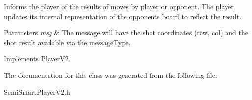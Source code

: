 Informs the player of the results of move\textquotesingle{}s by player or opponent. The player updates its internal representation of the opponent\textquotesingle{}s board to reflect the result. 


\begin{DoxyParams}{Parameters}
{\em msg} & The message will have the shot coordinates (row, col) and the shot result available via the message\+Type. \\
\hline
\end{DoxyParams}


Implements \hyperlink{classPlayerV2_a8d87312a1ce2756e25bb6e6438e8673c}{Player\+V2}.



The documentation for this class was generated from the following file\+:\begin{DoxyCompactItemize}
\item 
Semi\+Smart\+Player\+V2.\+h\end{DoxyCompactItemize}
